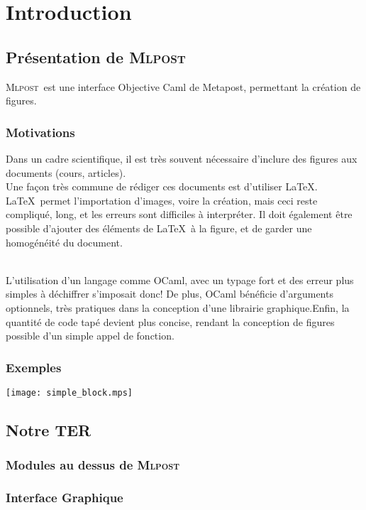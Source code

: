 \documentclass[a4paper,12pt]{article}
\newcommand{\mlpost}{\textsc{Mlpost}}
\begin{document}
\section{Introduction}

\subsection{Présentation de \mlpost}
\mlpost\ est une interface Objective Caml de Metapost, permettant la création de figures.
\subsubsection{Motivations}
Dans un cadre scientifique, il est très souvent nécessaire d'inclure des figures aux documents (cours, articles).
~\\Une façon très commune de rédiger ces documents est d'utiliser \LaTeX. \LaTeX\ permet l'importation d'images, voire la création, mais ceci reste compliqué, long, et les erreurs sont difficiles à interpréter. Il doit également être possible d'ajouter des éléments de \LaTeX\ à la figure, et de garder une homogénéité du document. 

~\\L'utilisation d'un langage comme OCaml, avec un typage fort et des erreur plus simples à déchiffrer s'imposait donc! De plus, OCaml bénéficie d'arguments optionnels, très pratiques dans la conception d'une librairie graphique.Enfin, la quantité de code tapé devient plus concise, rendant la conception de figures possible d'un simple appel de fonction.

\subsubsection{Exemples}

\texttt{[image: simple\_block.mps]}



\subsection{Notre TER}
\subsubsection{Modules au dessus de \mlpost}
\subsubsection{Interface Graphique}
\end{document}
